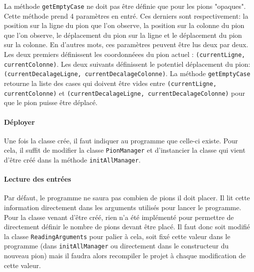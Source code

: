 \documentclass[a4paper,11pt]{article}
\begin{document}
          	La méthode \verb|getEmptyCase| ne doit pas être définie que pour les pions "opaques".  Cette méthode prend 4 paramètres en entré. Ces derniers sont respectivement: la position sur la ligne du pion que l'on observe, la position sur la colonne du pion que l'on observe, le déplacement du pion sur la ligne et le déplacement du pion sur la colonne. En d'autres mots, ces paramètres peuvent être lus deux par deux.  Les deux premiers définissent les coordonnéees du pion actuel : \verb|(currentLigne, currentColonne)|.  Les deux suivants définissent le potentiel déplacement du pion: \verb|(currentDecalageLigne, currentDecalageColonne)|. La méthode \verb|getEmptyCase| retourne la liste des cases qui doivent être vides entre \verb|(currentLigne, currentColonne)| et \verb|(currentDecalageLigne, currentDecalageColonne)| pour que le pion puisse être déplacé.

			\paragraph{Déployer}
				Une fois la classe crée, il faut indiquer au programme que celle-ci existe. Pour cela, il suffit de modifier la classe \verb|PionManager| et d'instancier la classe qui vient d'être créé dans la méthode \verb|initAllManager|.

			\paragraph{Lecture des entrées}
				Par défaut, le programme ne saura pas combien de pions il doit placer. Il lit cette information directement dans les arguments utilisés pour lancer le programme.  Pour la classe venant d'être créé, rien n'a été implémenté pour permettre de directement définir le nombre de pions devant être placé. Il faut donc soit modifié la classe \verb|ReadingArguments| pour palier à cela, soit fixé cette valeur dans le programme (dans \verb|initAllManager| ou directement dans le constructeur du nouveau pion) mais il faudra alors recompiler le projet à chaque modification de cette valeur.
      
\end{document}

